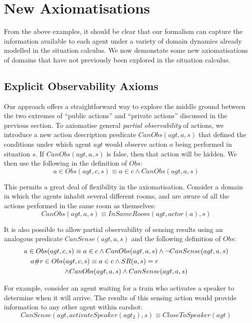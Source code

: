 \section{New Axiomatisations\label{sec:Observations:Axiomatising-extended}}

From the above examples, it should be clear that our formalism can
capture the information available to each agent under a variety of
domain dynamics already modelled in the situation calculus. We now
demonstate some new axiomatisations of domains that have not previously
been explored in the situation calculus.


\subsection{Explicit Observability Axioms}

Our approach offers a straightforward way to explore the middle ground
between the two extremes of {}``public actions'' and {}``private
actions'' discussed in the previous section. To axiomatise general
\emph{partial observability} of actions, we introduce a new action
description predicate $CanObs(agt,a,s)$ that defined the conditions
under which agent $agt$ would observe action $a$ being performed
in situation $s$. If $CanObs(agt,a,s)$ is false, then that action
will be hidden. We then use the following in the definition of $Obs$:\[
a\in Obs(agt,c,s)\equiv a\in c\wedge CanObs(agt,a,s)\]


This permits a great deal of flexibility in the axiomatisation. Consider
a domain in which the agents inhabit several different rooms, and
are aware of all the actions performed in the same room as themselves:\[
CanObs(agt,a,s)\equiv InSameRoom(agt,actor(a),s)\]


It is also possible to allow partial observability of sensing results
using an analogous predicate $CanSense(agt,a,s)$ and the following
definition of $Obs$:\begin{multline*}
a\in Obs(agt,c,s)\equiv a\in c\wedge CanObs(agt,a,s)\wedge\neg CanSense(agt,a,s)\\
\shoveleft{a\#r\in Obs(agt,c,s)\equiv a\in c\wedge SR(a,s)=r}\\
\wedge CanObs(agt,a,s)\wedge CanSense(agt,a,s)\end{multline*}


For example, consider an agent waiting for a train who activates a
speaker to determine when it will arrive. The results of this sensing
action would provide information to any other agent within earshot:\[
CanSense(agt,activateSpeaker(agt_{2}),s)\equiv CloseToSpeaker(agt)\]


